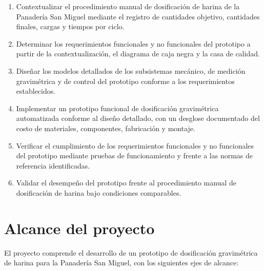 \begin{enumerate}

    \item Contextualizar el procedimiento manual de dosificación de harina de
    la Panadería San Miguel mediante el registro de cantidades objetivo,
    cantidades finales, cargas y tiempos por ciclo.

    \item Determinar los requerimientos funcionales y no funcionales del
    prototipo a partir de la contextualización, el diagrama de caja negra y
    la casa de calidad.

    \item Diseñar los modelos detallados de los subsistemas mecánico, de
    medición gravimétrica y de control del prototipo conforme a los
    requerimientos establecidos.

    \item Implementar un prototipo funcional de dosificación gravimétrica
    automatizada conforme al diseño detallado, con un desglose documentado
    del costo de materiales, componentes, fabricación y montaje.

    \item Verificar el cumplimiento de los requerimientos funcionales y no
    funcionales del prototipo mediante pruebas de funcionamiento y frente a
    las normas de referencia identificadas.

    \item Validar el desempeño del prototipo frente al procedimiento manual de
    dosificación de harina bajo condiciones comparables.

\end{enumerate}


\section{Alcance del proyecto}
\label{sec:delimitacion}


El proyecto comprende el desarrollo de un prototipo de dosificación
gravimétrica de harina para la Panadería San Miguel, con los siguientes
ejes de alcance:

